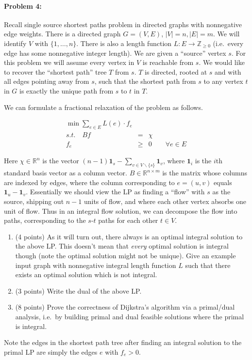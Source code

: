 \documentclass[12pt]{article}
\begin{document}
\paragraph{Problem 4:} Recall single source shortest paths problem in directed graphs with nonnegative edge weights. There is a directed graph $G = (V,E)$, $|V| = n, |E| = m$. We will identify $V$ with $\{1,\ldots,n\}$. There is also a length function $L:E\rightarrow\mathbb{Z}_{\ge 0}$ (i.e.\ every edge has some nonnegative integer length). We are given a ``source'' vertex $s$. For this problem we will assume every vertex in $V$ is reachable from $s$. We would like to recover the ``shortest path'' tree $T$ from $s$.  $T$ is directed, rooted at $s$ and with all edges pointing away from $s$, such that the shortest path from $s$ to any vertex $t$ in $G$ is exactly the unique path from $s$ to $t$ in $T$.

We can formulate a fractional relaxation of the problem as follows.

\begin{eqnarray*}
\min \sum_{e\in E} L(e)\cdot f_e & &  \\
s.t. \quad Bf &=& \chi  \\
f_e & \geq & 0 \qquad \forall e\in E
\end{eqnarray*}

Here $\chi\in\mathbb{R}^n$ is the vector $(n-1)\mathbf{1}_s - \sum_{v\in V\backslash \{s\}} \mathbf{1}_v$, where $\mathbf{1}_i$ is the $i$th standard basis vector as a column vector. $B\in\mathbb{R}^{n\times m}$ is the matrix whose columns are indexed by edges, where the column corresponding to $e = (u,v)$ equals $\mathbf{1}_u - \mathbf{1}_v$. Essentially we should view the LP as finding a ``flow'' with $s$ as the source, shipping out $n-1$ units of flow, and where each other vertex absorbs one unit of flow. Thus in an integral flow solution, we can decompose the flow into paths, corresponding to the $s$-$t$ paths for each other $t\in V$. 

\begin{enumerate}
\item (4 points) As it will turn out, there always is an optimal integral solution to the above LP. This doesn't mean that {\em every} optimal solution is integral though (note the optimal solution might not be unique). Give an example input graph with nonnegative integral length function $L$ such that there exists an optimal solution which is not integral.
\item (3 points) Write the dual of the above LP.
\item (8 points) Prove the correctness of Dijkstra's algorithm via a primal/dual analysis, i.e.\ by building primal and dual feasible solutions where the primal is integral.
\end{enumerate}

Note the edges in the shortest path tree after finding an integral solution to the primal LP are simply the edges $e$ with $f_e > 0$.
\end{document}
